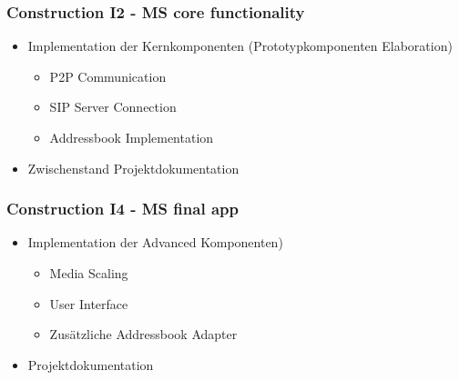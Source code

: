 		\subsubsection{Construction I2 - MS core functionality}
			\begin{itemize}
				\item Implementation der Kernkomponenten (Prototypkomponenten Elaboration)
					\begin{itemize}
						\item P2P Communication
						\item SIP Server Connection
						\item Addressbook Implementation
					\end{itemize}
				\item Zwischenstand Projektdokumentation
			\end{itemize}
			
		\subsubsection{Construction I4 - MS final app}
			\begin{itemize}
				\item Implementation der Advanced Komponenten)
					\begin{itemize}
						\item Media Scaling
						\item User Interface
						\item Zusätzliche Addressbook Adapter
					\end{itemize}
				\item Projektdokumentation
			\end{itemize}
	

